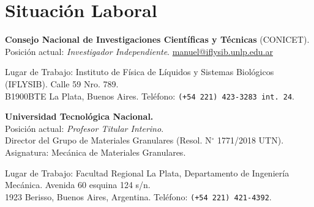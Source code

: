 \section*{Situación Laboral}

 \textbf{Consejo Nacional de Investigaciones Científicas y Técnicas} (CONICET). \\Posición actual: \textit{Investigador Independiente}. \faEnvelopeO{} \href{mailto:manuel@iflysib.unlp.edu.ar}{manuel@iflysib.unlp.edu.ar}

  Lugar de Trabajo: Instituto de Física de Líquidos y Sistemas Biológicos (IFLYSIB). Calle 59 Nro. 789.\\ B1900BTE  La Plata, Buenos Aires. Teléfono: \texttt{(+54 221) 423-3283 int. 24}.

   \textbf{Universidad Tecnológica Nacional.} \\Posición actual: \textit{Profesor Titular Interino}.\\
Director del Grupo de Materiales Granulares (Resol. N$^\circ$ 1771/2018 UTN).\\
Asignatura: Mecánica de Materiales Granulares.

Lugar de Trabajo: Facultad Regional La Plata, Departamento de Ingeniería Mecánica. Avenida 60 esquina 124 s/n. \\1923 Berisso, Buenos Aires, Argentina. Teléfono: \texttt{(+54 221) 421-4392}.

  
% 
